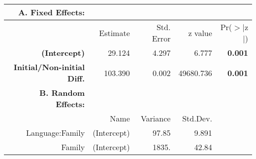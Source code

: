 \begin{tabular}{rrrrr}
 {\bf A. Fixed Effects:} \\
\hline
 & Estimate & Std. Error & z value & Pr($>$$|$z$|$) \\ 
  \hline
{\bf (Intercept)} & 29.124 & 4.297 & 6.777 & {\bf 0.001} \\ 
  {\bf Initial/Non-initial Diff.} & 103.390 & 0.002 & 49680.736 & {\bf 0.001} \\ 

\hline \hline
{\bf B. Random Effects:} \\
\hline
& Name & Variance & Std.Dev. \\
\hline
Language:Family & (Intercept) & 97.85 & 9.891 \\
Family & (Intercept) & 1835. & 42.84 \\
\end{tabular}

